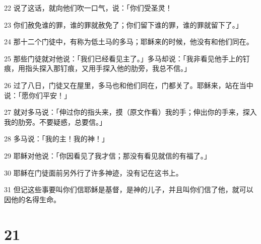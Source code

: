 \par 22 说了这话，就向他们吹一口气，说：「你们受圣灵！
\par 23 你们赦免谁的罪，谁的罪就赦免了；你们留下谁的罪，谁的罪就留下了。」
\par 24 那十二个门徒中，有称为低土马的多马；耶稣来的时候，他没有和他们同在。
\par 25 那些门徒就对他说：「我们已经看见主了。」多马却说：「我非看见他手上的钉痕，用指头探入那钉痕，又用手探入他的肋旁，我总不信。」
\par 26 过了八日，门徒又在屋里，多马也和他们同在，门都关了。耶稣来，站在当中说：「愿你们平安！」
\par 27 就对多马说：「伸过你的指头来，摸（原文作看）我的手；伸出你的手来，探入我的肋旁。不要疑惑，总要信。」
\par 28 多马说：「我的主！我的神！」
\par 29 耶稣对他说：「你因看见了我才信；那没有看见就信的有福了。」
\par 30 耶稣在门徒面前另外行了许多神迹，没有记在这书上。
\par 31 但记这些事要叫你们信耶稣是基督，是神的儿子，并且叫你们信了他，就可以因他的名得生命。

\chapter{21}

